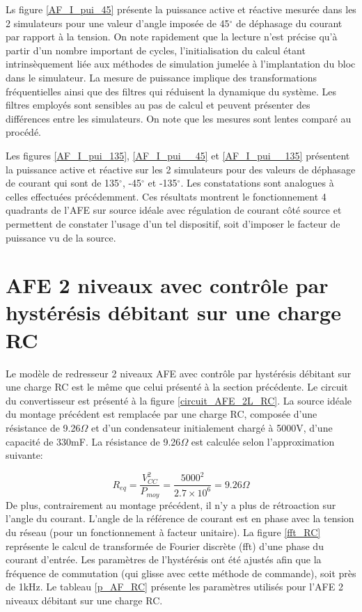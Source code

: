 Ls figure \ref{AF_I_pui_45} présente la puissance active et réactive mesurée dans les 2 simulateurs pour une valeur d'angle imposée de 45$^\circ$ de déphasage du courant par rapport à la tension. On note rapidement que la lecture n'est précise qu'à partir d'un nombre important de cycles, l'initialisation du calcul étant intrinsèquement liée aux méthodes de simulation jumelée à l'implantation du bloc dans le simulateur. La mesure de puissance implique des transformations fréquentielles ainsi que des filtres qui réduisent la dynamique du système. Les filtres employés sont sensibles au pas de calcul et peuvent présenter des différences entre les simulateurs. On note que les mesures sont lentes comparé au procédé.

Les figures \ref{AF_I_pui_135}, \ref{AF_I_pui__45} et \ref{AF_I_pui__135} présentent la puissance active et réactive sur les 2 simulateurs pour des valeurs de déphasage de courant qui sont de 135$^\circ$, -45$^\circ$ et -135$^\circ$. Les constatations sont analogues à celles effectuées précédemment. Ces résultats montrent le fonctionnement 4 quadrants de l'AFE sur source idéale avec régulation de courant côté source et permettent de constater l'usage d'un tel dispositif, soit d'imposer le facteur de puissance vu de la source. 
\section{AFE 2 niveaux avec contrôle par hystérésis débitant sur une charge RC}
Le modèle de redresseur 2 niveaux AFE avec contrôle par hystérésis débitant sur une charge RC est le même que celui présenté à la section précédente. Le circuit du convertisseur est présenté à la figure \ref{circuit_AFE_2L_RC}. La source idéale du montage précédent est remplacée par une charge RC, composée d'une résistance de 9.26$\Omega$ et d'un condensateur initialement chargé à 5000V, d'une capacité de 330mF. La résistance de 9.26$\Omega$ est calculée selon l'approximation suivante:

\begin{equation}
R_{eq} = \frac{V_{CC}^2}{P_{moy}} = \frac{5000^2}{2.7 \times 10^6} = 9.26\Omega
\end{equation}
De plus, contrairement au montage précédent, il n'y a plus de rétroaction sur l'angle du courant. L'angle de la référence de courant est en phase avec la tension du réseau (pour un fonctionnement à facteur unitaire). La figure \ref{fft_RC} représente le calcul de transformée de Fourier discrète (fft) d'une phase du courant d'entrée. Les paramètres de l'hystérésis ont été ajustés afin que la fréquence de commutation (qui glisse avec cette méthode de commande), soit près de 1kHz. Le tableau \ref{p_AF_RC} présente les paramètres utilisés pour l'AFE 2 niveaux débitant sur une charge RC.

